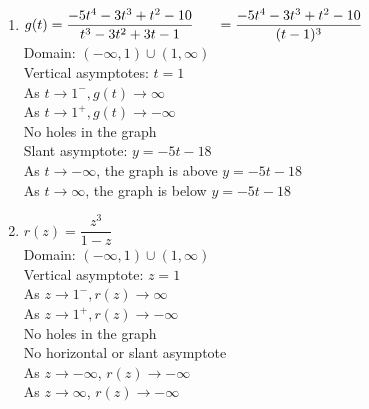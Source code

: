 \begin{multicols}{2}
\begin{enumerate}
\setcounter{enumi}{\value{HW}}

\item \small $g(t) = \dfrac{-5t^{4} - 3t^{3} + t^{2} - 10}{t^{3} - 3t^{2} + 3t - 1} \\ \phantom{g(t)} = \dfrac{-5t^{4} - 3t^{3} + t^{2} - 10}{(t-1)^3} $ \normalsize \\
Domain: $(-\infty, 1) \cup (1, \infty)$\\
Vertical asymptotes: $t = 1$\\
As $t \rightarrow 1^{-}, g(t) \rightarrow \infty$\\
As $t \rightarrow 1^{+}, g(t) \rightarrow -\infty$\\
No holes in the graph \\
Slant asymptote: $y=-5t-18$ \\
 \small  As $t \rightarrow -\infty$, the graph is above $y=-5t-18$ \normalsize\\
 \small  As $t \rightarrow \infty$, the graph is below $y=-5t-18$ \normalsize \\
 
 \vfill
 
 \columnbreak

\item $r(z) = \dfrac{z^3}{1-z}$\\
Domain: $(-\infty, 1) \cup (1, \infty)$\\
Vertical asymptote: $z=1$\\
As $z \rightarrow 1^{-}, r(z) \rightarrow \infty$\\
As $z \rightarrow 1^{+}, r(z) \rightarrow -\infty$\\
No holes in the graph \\
No horizontal or slant asymptote \\
As $z \rightarrow -\infty$, $r(z) \rightarrow -\infty$\\
As $z \rightarrow \infty$, $r(z) \rightarrow -\infty$\\


\setcounter{HW}{\value{enumi}}
\end{enumerate}
\end{multicols}

